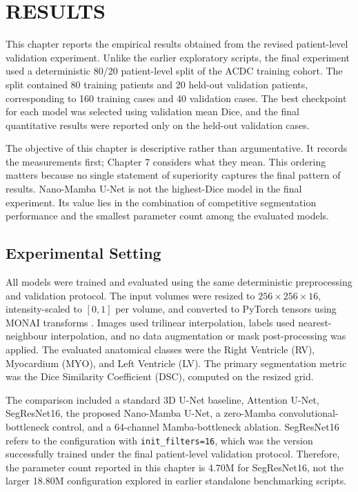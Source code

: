 
\chapter{RESULTS}
\label{chap:results}

This chapter reports the empirical results obtained from the revised patient-level validation experiment. Unlike the earlier exploratory scripts, the final experiment used a deterministic 80/20 patient-level split of the ACDC training cohort. The split contained 80 training patients and 20 held-out validation patients, corresponding to 160 training cases and 40 validation cases. The best checkpoint for each model was selected using validation mean Dice, and the final quantitative results were reported only on the held-out validation cases.

The objective of this chapter is descriptive rather than argumentative. It records the measurements first; Chapter 7 considers what they mean. This ordering matters because no single statement of superiority captures the final pattern of results. Nano-Mamba U-Net is not the highest-Dice model in the final experiment. Its value lies in the combination of competitive segmentation performance and the smallest parameter count among the evaluated models.

\section{Experimental Setting}
All models were trained and evaluated using the same deterministic preprocessing and validation protocol. The input volumes were resized to $256 \times 256 \times 16$, intensity-scaled to $[0,1]$ per volume, and converted to PyTorch tensors using MONAI transforms \citep{cardoso2022monai}. Images used trilinear interpolation, labels used nearest-neighbour interpolation, and no data augmentation or mask post-processing was applied. The evaluated anatomical classes were the Right Ventricle (RV), Myocardium (MYO), and Left Ventricle (LV). The primary segmentation metric was the Dice Similarity Coefficient (DSC), computed on the resized grid.

The comparison included a standard 3D U-Net baseline, Attention U-Net, SegResNet16, the proposed Nano-Mamba U-Net, a zero-Mamba convolutional-bottleneck control, and a 64-channel Mamba-bottleneck ablation. SegResNet16 refers to the configuration with \texttt{init\_filters=16}, which was the version successfully trained under the final patient-level validation protocol. Therefore, the parameter count reported in this chapter is 4.70M for SegResNet16, not the larger 18.80M configuration explored in earlier standalone benchmarking scripts.

